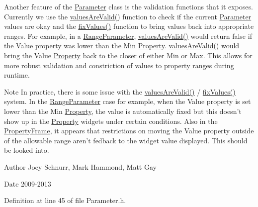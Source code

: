 Another feature of the \hyperlink{class_picto_1_1_parameter}{Parameter} class is the validation functions that it exposes. Currently we use the \hyperlink{class_picto_1_1_parameter_a3443808da4c3edf26f2c3c3772d95b10}{values\-Are\-Valid()} function to check if the current \hyperlink{class_picto_1_1_parameter}{Parameter} values are okay and the \hyperlink{class_picto_1_1_parameter_a219dc74f193fc0f25e813275a945b822}{fix\-Values()} function to bring values back into appropriate ranges. For example, in a \hyperlink{class_picto_1_1_range_parameter}{Range\-Parameter}, \hyperlink{class_picto_1_1_parameter_a3443808da4c3edf26f2c3c3772d95b10}{values\-Are\-Valid()} would return false if the Value property was lower than the Min \hyperlink{class_picto_1_1_property}{Property}. \hyperlink{class_picto_1_1_parameter_a3443808da4c3edf26f2c3c3772d95b10}{values\-Are\-Valid()} would bring the Value \hyperlink{class_picto_1_1_property}{Property} back to the closer of either Min or Max. This allows for more robust validation and constriction of values to property ranges during runtime. \begin{DoxyNote}{Note}
In practice, there is some issue with the \hyperlink{class_picto_1_1_parameter_a3443808da4c3edf26f2c3c3772d95b10}{values\-Are\-Valid()} / \hyperlink{class_picto_1_1_parameter_a219dc74f193fc0f25e813275a945b822}{fix\-Values()} system. In the \hyperlink{class_picto_1_1_range_parameter}{Range\-Parameter} case for example, when the Value property is set lower than the Min \hyperlink{class_picto_1_1_property}{Property}, the value is automatically fixed but this doesn't show up in the \hyperlink{class_picto_1_1_property}{Property} widgets under certain conditions. Also in the \hyperlink{class_property_frame}{Property\-Frame}, it appears that restrictions on moving the Value property outside of the allowable range aren't fedback to the widget value displayed. This should be looked into. 
\end{DoxyNote}
\begin{DoxyAuthor}{Author}
Joey Schnurr, Mark Hammond, Matt Gay 
\end{DoxyAuthor}
\begin{DoxyDate}{Date}
2009-\/2013 
\end{DoxyDate}


Definition at line 45 of file Parameter.\-h.



